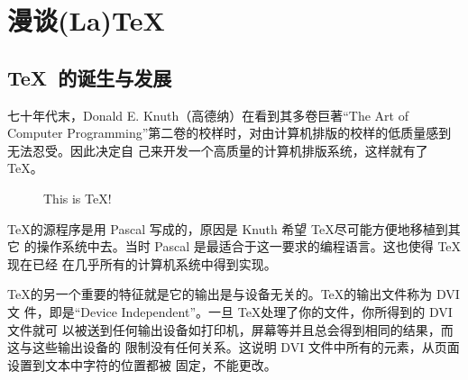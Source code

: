 \documentclass[DIV=14,fontsize=11,headinclude=false,index=totoc,footinclude=false,headings=small]{tkz-doc}
\begin{document}
 \clearpage
 \tableofcontents

 \newpage

\setlength{\parindent}{2em}

\section{漫谈(La)TeX}

\subsection{\TeX\ 的诞生与发展}
\label{sec:history}

七十年代末，Donald E. Knuth（高德纳）在看到其多卷巨著“The Art of Computer
Programming”第二卷的校样时，对由计算机排版的校样的低质量感到无法忍受。因此决定自
己来开发一个高质量的计算机排版系统，这样就有了 \TeX。

\begin{figure}[htbp]
  \centering
  \caption{This is \TeX !}
  \label{fig:lion}
\end{figure}

\TeX 的源程序是用 Pascal 写成的，原因是 Knuth 希望 \TeX 尽可能方便地移植到其它
的操作系统中去。当时 Pascal 是最适合于这一要求的编程语言。这也使得 \TeX 现在已经
在几乎所有的计算机系统中得到实现。

\TeX 的另一个重要的特征就是它的输出是与设备无关的。\TeX 的输出文件称为 DVI 文
件，即是“Device Independent”。一旦 \TeX 处理了你的文件，你所得到的 DVI 文件就可
以被送到任何输出设备如打印机，屏幕等并且总会得到相同的结果，而这与这些输出设备的
限制没有任何关系。这说明 DVI 文件中所有的元素，从页面设置到文本中字符的位置都被
固定，不能更改。
\end{document}
